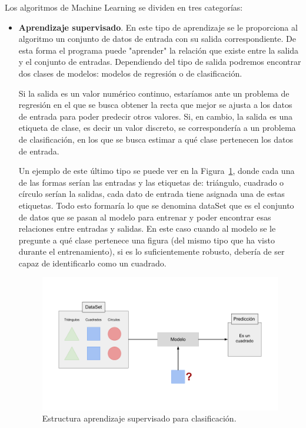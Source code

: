 \documentclass[a4paper, 12pt]{book}
\begin{document}
 Los algoritmos de Machine Learning se dividen en tres categorías: 

\begin{itemize}
    \item \textbf{Aprendizaje supervisado}. En este tipo de aprendizaje se le proporciona al algoritmo un conjunto de datos de entrada con su salida correspondiente. De esta forma el programa puede "aprender" la relación que existe entre la salida y el conjunto de entradas. Dependiendo del tipo de salida podremos encontrar dos clases de modelos: modelos de regresión o de clasificación.
    
    Si la salida es un valor numérico continuo, estaríamos ante un problema de regresión en el que se busca obtener la recta que mejor se ajusta a los datos de entrada para poder predecir otros valores. Si, en cambio, la salida es una etiqueta de clase, es decir un valor discreto, se correspondería a un problema de clasificación, en los que se busca estimar a qué clase pertenecen los datos de entrada. 
    
    Un ejemplo de este último tipo se puede ver en la Figura~\ref{fig:a_supervisado}, donde cada una de las formas serían las entradas y las etiquetas de: triángulo, cuadrado o círculo serían la salidas, cada dato de entrada tiene asignada una de estas etiquetas. Todo esto formaría lo que se denomina dataSet que es el conjunto de datos que se pasan al modelo para entrenar y poder encontrar esas relaciones entre entradas y salidas. En este caso cuando al modelo se le pregunte a qué clase pertenece una figura (del mismo tipo que ha visto durante el entrenamiento), si es lo suficientemente robusto, debería de ser capaz de identificarlo como un cuadrado.
    
    \begin{figure}[h!]
      \centering
      \includegraphics[width=12cm, keepaspectratio]{img/a_supervisado.png}
      \caption{Estructura aprendizaje supervisado para clasificación.}\label{fig:a_supervisado}
    \end{figure}
    

\end{itemize}
\end{document}
